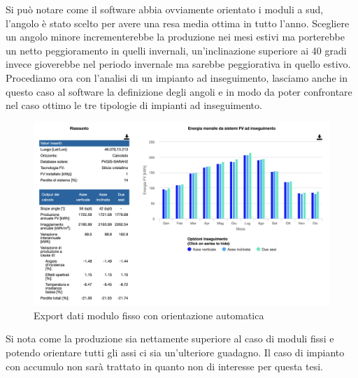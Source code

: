 Si può notare come il software abbia ovviamente orientato i moduli a sud, l'angolo è stato scelto per avere una resa media ottima in tutto l'anno.
Scegliere un angolo minore incrementerebbe la produzione nei mesi estivi ma porterebbe un netto peggioramento in quelli invernali, un'inclinazione superiore ai 40 gradi invece gioverebbe nel periodo invernale ma sarebbe peggiorativa in quello estivo.
Procediamo ora con l'analisi di un impianto ad inseguimento, lasciamo anche in questo caso al software la definizione degli angoli e in modo da poter confrontare nel caso ottimo le tre tipologie di impianti ad inseguimento.
\begin{figure}[H]
    \centering
    \includegraphics[height=0.6\textwidth]{res/cap 4/inseguimento uniud-auto}
    \caption{Export dati modulo fisso con orientazione automatica}
\end{figure}\noindent
Si nota come la produzione sia nettamente superiore al caso di moduli fissi e potendo orientare tutti gli assi ci sia un'ulteriore guadagno.
Il caso di impianto con accumulo non sarà trattato in quanto non di interesse per questa tesi.
